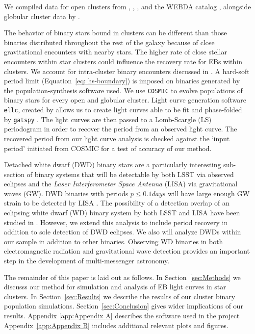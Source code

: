 \documentclass[twocolumn]{aastex63}
\begin{document}
We compiled data for open clusters from \citet{2008A&A...477..165P}, \citet{2004A&A...414..163S}, \citet{2006AJ....131.1559V}, and the WEBDA catalog \citep{1995MNRAS.275..828M}, alongside globular cluster data by \citet{1996AJ....112.1487H}. 

The behavior of binary stars bound in clusters can be different than those binaries distributed throughout the rest of the galaxy because of close gravitational encounters with nearby stars. The higher rate of close stellar encounters within star clusters could influence the recovery rate for EBs within clusters. We account for intra-cluster binary encounters discussed in \citet{2015ApJ...808L..25G}. A hard-soft period limit (Equation~\ref{eq: hs-boundary}) is imposed on binaries generated by the population-synthesis software used. We use \texttt{COSMIC} \citep{2018PhDT........74B} to evolve populations of binary stars for every open and globular cluster. Light curve generation software \texttt{ellc}, created by \citet{2016ascl.soft03016M} allows us to create light curves able to be fit and phase-folded by \texttt{gatspy} \citep{2015ApJ...812...18V}. The light curves are then passed to a Lomb-Scargle (LS) periodogram in order to recover the period from an observed light curve. The recovered period from our light curve analysis is checked against the ‘input period’ initiated from COSMIC for a test of accuracy of our method.

Detached white dwarf (DWD) binary stars are a particularly interesting sub-section of binary systems that will be detectable by both LSST via observed eclipses and the \textit{Laser Interferometer Space Antenna} (LISA) via gravitational waves (GW). DWD binaries with periods $p \leq 0.1 days$ will have large enough GW strain to be detected by LISA \citep{2017MNRAS.470.1894K}. The possibility of a detection overlap of an eclipsing white dwarf (WD) binary system by both LSST and LISA have been studied in \citet{2017MNRAS.470.1894K}. However, we extend this analysis to include period recovery in addition to sole detection of DWD eclipses. We also will analyze DWDs within our sample in addition to other binaries. Observing WD binaries in both electromagnetic radiation and gravitational wave detection provides an important step in the development of multi-messenger astronomy.

The remainder of this paper is laid out as follows. In Section~\ref{sec:Methods} we discusss our method for simulation and analysis of EB light curves in star clusters. In Section~\ref{sec:Results} we describe the results of our cluster binary population simulations. Section~\ref{sec:Conclusion} gives wider implications of our results. Appendix \ref{app:Appendix A} describes the software used in the project
Appendix~\ref{app:Appendix B} includes additional relevant plots and figures.
\end{document}
